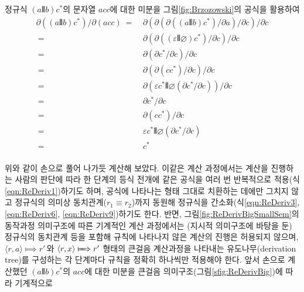정규식 $(a\VERT b)c^{*}$의 문자열 $acc$에 대한 미분을
그림\;\ref{fig:Brzozowski}의 공식을 활용하여 \vspace*{-2ex}
{\addtolength{\jot}{-1ex}
\begin{align}
     \partial((a\VERT b)c^{*})/\partial(acc)
~=~& \partial(\partial(\partial((a\VERT b)c^{*})
            / \partial a)/\partial c)/\partial c     \label{eqn:ReDeriv1}\\
~=~& \partial(\partial((\varepsilon\VERT\varnothing)c^{*})
            / \partial c)/\partial c                 \label{eqn:ReDeriv2}\\
~=~& \partial(\partial c^{*}/\partial c)/\partial c  \label{eqn:ReDeriv3}\\
~=~& \partial(\partial(cc^{*})/\partial c)/\partial c \label{eqn:ReDeriv4}\\
~=~& \partial(\varepsilon c^{*}\VERT\varnothing(\partial c^{*}/\partial c))
     /\partial c                                     \label{eqn:Rederiv5}\\
~=~& \partial c^{*}/\partial c                       \label{eqn:ReDeriv6}\\
~=~& \partial(cc^{*})/\partial c                     \label{eqn:ReDeriv7}\\
~=~& \varepsilon c^{*}\VERT\varnothing(\partial c^{*}/\partial c)
                                                     \label{eqn:ReDeriv8}\\
~=~& c^{*}                                           \label{eqn:ReDeriv9}
\end{align}
\vspace*{-5ex}\\
}
위와 같이 손으로 풀어 나가듯 계산해 보았다. 이같은 계산 과정에서는
계산을 진행하는 사람의 판단에 따라 한 단계의 등식 전개에 같은 공식을
여러 번 반복적으로 적용(식\;\ref{eqn:ReDeriv1})하기도 하며,
공식에 나타나는 형태 그대로 치환하는 데에만 그치지 않고 정규식의 의미상
동치관계($r_1\equiv r_2$)까지 동원해 정규식을 간소화(식\;\ref{eqn:ReDeriv3},
\ref{eqn:ReDeriv6}, \ref{eqn:ReDeriv9})하기도 한다.
반면, 그림\;\ref{fig:ReDerivBigSmallSem}의
동작과정 의미구조에 따른 기계적인 계산 과정에서는 (지시적 의미구조에
바탕을 둔) 정규식의 동치관계 등을 포함해 규칙에 나타나지 않은 계산의
진행은 허용되지 않으며, $\langle r,a\rangle\Longmapsto r'$\,와
$\langle r,x\rangle\LONGmapsto r'$ 형태의 큰걸음
계산과정을 나타내는 유도나무(derivation tree)를 구성하는 각 단계마다
규칙을 정확히 하나씩만 적용해야 한다. 앞서 손으로 계산했던
$(a\VERT b)c^{*}$의 $acc$에 대한 미분을
큰걸음 의미구조(그림\;\ref{sfig:ReDerivBig})에 따라 기계적으로
